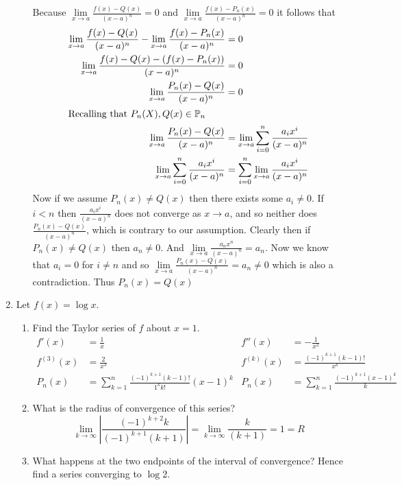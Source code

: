 \documentclass[letterpaper]{article}
\begin{document}
\begin{enumerate}
\begin{enumerate}
  Because $\lim\limits_{x\to a}\frac{f(x)-Q(x)}{(x-a)^n}=0$
  and $\lim\limits_{x\to a}\frac{f(x)-P_n(x)}{(x-a)^n}=0$ it follows that
  \begin{align*}
    \lim\limits_{x\to a}\frac{f(x)-Q(x)}{(x-a)^n}-\lim\limits_{x\to a}\frac{f(x)-P_n(x)}{(x-a)^n}&=0\\
    \lim\limits_{x\to a}\frac{f(x)-Q(x)-(f(x)-P_n(x))}{(x-a)^n}&=0\\
    \lim\limits_{x\to a}\frac{P_n(x)-Q(x)}{(x-a)^n}&=0\\
    \intertext{Recalling that $P_n(X),Q(x)\in\mathbb{P}_n$}
    \lim\limits_{x\to a}\frac{P_n(x)-Q(x)}{(x-a)^n}
    &=\lim\limits_{x\to a}\sum\limits_{i=0}^n{\frac{a_ix^i}{(x-a)^n}}\\
    \lim\limits_{x\to a}\sum\limits_{i=0}^n{\frac{a_ix^i}{(x-a)^n}}
    &=\sum\limits_{i=0}^n{\lim\limits_{x\to a}\frac{a_ix^i}{(x-a)^n}}\\
  \end{align*}
  Now if we assume $P_n(x)\ne Q(x)$ then there exists some $a_i\ne 0$. If $i<n$ then $\frac{a_ix^i}{(x-a)^n}$ does not converge as $x\to a$, and so neither does $\frac{P_n(x)-Q(x)}{(x-a)^n}$, which is contrary to our assumption. Clearly then if $P_n(x)\ne Q(x)$ then $a_n\ne 0$. And $\lim\limits_{x\to a}\frac{a_nx^n}{(x-a)^n}=a_n$. Now we know that $a_i=0$ for $i\ne n$ and so $\lim\limits_{x\to a}\frac{P_n(x)-Q(x)}{(x-a)^n}=a_n\ne 0$ which is also a contradiction. Thus $P_n(x)=Q(x)$
  \end{enumerate}
\setcounter{enumi}{5}
\item
Let $f(x)=\log x$.
  \begin{enumerate}
  \item
  Find the Taylor series of $f$ about $x=1$.
  \begin{align*}
    f'(x)&=\frac{1}{x}&
    f''(x)&=-\frac{1}{x^2}\\
    f^{(3)}(x)&=\frac{2}{x^3}&
    f^{(k)}(x)&=\frac{(-1)^{k+1}(k-1)!}{x^k}\\
    P_n(x)&=\sum\limits_{k=1}^n{\frac{(-1)^{k+1}(k-1)!}{1^kk!}(x-1)^k}&
    P_n(x)&=\sum\limits_{k=1}^n{\frac{(-1)^{k+1}(x-1)^k}{k}}
  \end{align*}
  \item
  What is the radius of convergence of this series?
  \[\lim\limits_{k\to\infty}\left\lvert\frac{(-1)^{k+2}k}{(-1)^{k+1}(k+1)}\right\rvert
  =\lim\limits_{k\to\infty}\frac{k}{(k+1)}=1=R \]
  \item
  What happens at the two endpoints of the interval of convergence? Hence find a series converging to $\log 2$.

\end{enumerate}
\end{enumerate}
\end{document}
